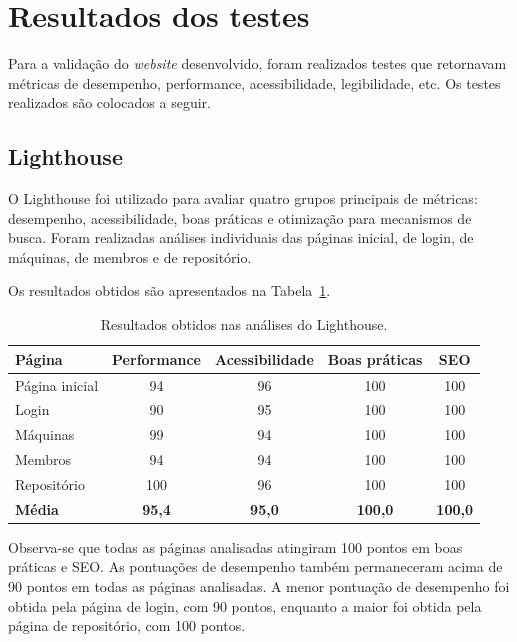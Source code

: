 \vspace{5mm}
\section{Resultados dos testes}

Para a validação do \textit{website} desenvolvido, foram realizados testes que retornavam métricas de desempenho, performance, acessibilidade, legibilidade, etc. Os testes realizados são colocados a seguir. 
\vspace{5mm}
\subsection{Lighthouse}

O Lighthouse foi utilizado para avaliar quatro grupos principais de métricas: desempenho, acessibilidade, boas práticas e otimização para mecanismos de busca. Foram realizadas análises individuais das páginas inicial, de login, de máquinas, de membros e de repositório.

Os resultados obtidos são apresentados na Tabela~\ref{tab:lighthouse-resultados}.

\begin{table}[H]
	\centering
	\caption{Resultados obtidos nas análises do Lighthouse.}
	\label{tab:lighthouse-resultados}
	\renewcommand{\arraystretch}{1.4}
	\setlength{\tabcolsep}{14pt}
	\begin{tabular}{lcccc}
		\hline
		\textbf{Página} & \textbf{Performance} & \textbf{Acessibilidade} & \textbf{Boas práticas} & \textbf{SEO} \\
		\hline
		Página inicial & 94 & 96 & 100 & 100 \\
		Login          & 90 & 95 & 100 & 100 \\
		Máquinas       & 99 & 94 & 100 & 100 \\
		Membros        & 94 & 94 & 100 & 100 \\
		Repositório    & 100 & 96 & 100 & 100 \\
		\hline
		\textbf{Média} & \textbf{95,4} & \textbf{95,0} & \textbf{100,0} & \textbf{100,0} \\
		\hline
	\end{tabular}
\end{table}


Observa-se que todas as páginas analisadas atingiram 100 pontos em boas práticas e SEO. As pontuações de desempenho também permaneceram acima de 90 pontos em todas as páginas analisadas. A menor pontuação de desempenho foi obtida pela página de login, com 90 pontos, enquanto a maior foi obtida pela página de repositório, com 100 pontos.

